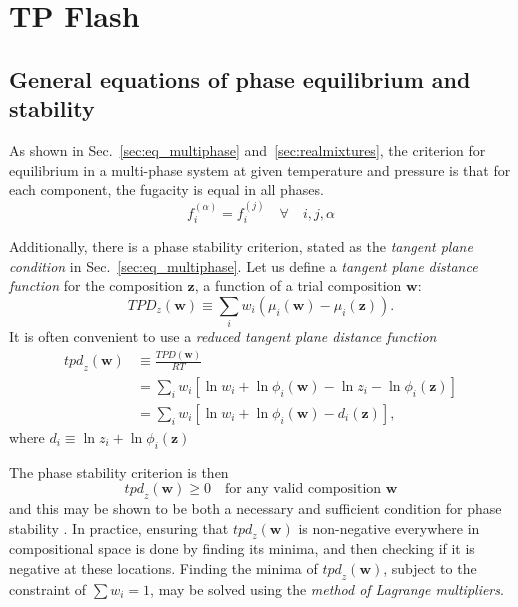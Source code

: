 \documentclass[english]{../thermomemo/thermomemo}
\newcommand*{\vektor}[1]{\boldsymbol{#1}}%
\begin{document}
\section{TP Flash}

\subsection{General equations of phase equilibrium and stability}
As shown in Sec.~\ref{sec:eq_multiphase} and~\ref{sec:realmixtures}, the criterion for equilibrium in a multi-phase system at given temperature 
and pressure is that for each component, the fugacity is equal in all phases.
\begin{equation}
  f_i^{(\alpha)} = f_i^{(j)} \quad \forall \quad i,j,\alpha
  \label{}
\end{equation}

Additionally, there is a phase stability criterion, stated as the \textit{tangent plane condition} in Sec.~\ref{sec:eq_multiphase}.
Let us define a \textit{tangent plane distance function} for the composition $\vektor{z}$, a function of a trial composition $\vektor{w}$:
\begin{equation}
  \mathit{TPD}_z(\vektor{w}) \equiv \sum_{i} w_i \left( \mu_i(\vektor{w}) - \mu_i(\vektor{z}) \right).
  \label{}
\end{equation}
It is often convenient to use a 
\textit{reduced tangent plane distance function}
\begin{align}
  \mathit{tpd}_z(\vektor{w}) &\equiv \frac{\mathit{TPD}(\vektor{w})}{RT} 
  \nonumber\\
  &= \sum_{i} w_i \left[ \ln w_i + \ln \phi_i(\vektor{w}) - \ln z_i - \ln \phi_i(\vektor{z}) \right]
  \nonumber\\
  &= \sum_{i} w_i \left[ \ln w_i + \ln \phi_i(\vektor{w}) - d_i(\vektor{z}) \right],
  \label{}
\end{align}
where $d_i \equiv \ln z_i + \ln \phi_i(\vektor{z}) $

The phase stability criterion is then
\begin{equation}
  \mathit{tpd}_z(\vektor{w}) \geq 0 \quad \text{for any valid composition $\vektor{w}$}
  \label{}
\end{equation}
and this may be shown to be both a necessary and sufficient condition for phase stability \cite{michelsen07}. 
In practice, ensuring that $\mathit{tpd}_z(\vektor{w})$ is non-negative everywhere in compositional space is done by finding its 
minima, and then checking if it is negative at these locations. Finding the minima of $\mathit{tpd}_z(\vektor{w})$, subject to the constraint of 
$\sum w_i = 1$, may be solved using the \textit{method of Lagrange multipliers}.
\end{document}
